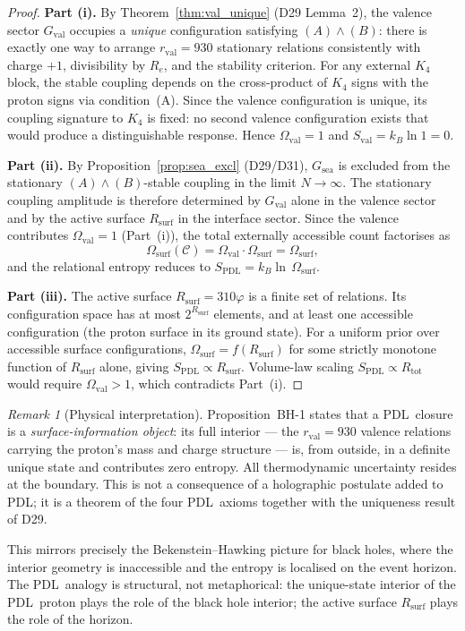 \documentclass[11pt,a4paper]{article}
\theoremstyle{plain}
\theoremstyle{definition}
\theoremstyle{remark}
\newtheorem{remark}[theorem]{Remark}
\newcommand{\PDL}{\textsc{PDL}}
\newcommand{\Kfour}{K_4}
\newcommand{\rval}{r_{\mathrm{val}}}
\newcommand{\Rtot}{R_{\mathrm{tot}}}
\newcommand{\Rsurf}{R_{\mathrm{surf}}}
\newcommand{\Gval}{G_{\mathrm{val}}}
\newcommand{\Gsea}{G_{\mathrm{sea}}}
\newcommand{\vp}{\varphi}
\newcommand{\SPDL}{S_{\mathrm{PDL}}}
\newcommand{\Omsurf}{\Omega_{\mathrm{surf}}}
\begin{document}
\begin{proof}
\textbf{Part (i).}
By Theorem~\ref{thm:val_unique} (D29 Lemma~2), the valence sector $\Gval$ occupies a
\emph{unique} configuration satisfying $(A)\wedge(B)$: there is exactly one way to
arrange $\rval = 930$ stationary relations consistently with charge $+1$,
divisibility by $R_e$, and the stability criterion. For any external $\Kfour$ block,
the stable coupling depends on the cross-product of $\Kfour$ signs with the proton
signs via condition~(A). Since the valence configuration is unique, its coupling
signature to $\Kfour$ is fixed: no second valence configuration exists that would
produce a distinguishable response. Hence $\Omega_{\mathrm{val}} = 1$ and
$S_{\mathrm{val}} = k_B\ln 1 = 0$.

\textbf{Part (ii).}
By Proposition~\ref{prop:sea_excl} (D29/D31), $\Gsea$ is excluded from the
stationary $(A)\wedge(B)$-stable coupling in the limit $N\to\infty$. The stationary
coupling amplitude is therefore determined by $\Gval$ alone in the valence sector
and by the active surface $\Rsurf$ in the interface sector. Since the valence
contributes $\Omega_{\mathrm{val}} = 1$ (Part~(i)), the total externally accessible
count factorises as
\begin{equation}
  \Omsurf(\mathcal{C}) = \Omega_{\mathrm{val}}\cdot\Omega_{\mathrm{surf}} = \Omega_{\mathrm{surf}},
\end{equation}
and the relational entropy reduces to $\SPDL = k_B\ln\,\Omega_{\mathrm{surf}}$.

\textbf{Part (iii).}
The active surface $\Rsurf = 310\vp$ is a finite set of relations. Its configuration
space has at most $2^{\Rsurf}$ elements, and at least one accessible configuration
(the proton surface in its ground state). For a uniform prior over accessible
surface configurations, $\Omega_{\mathrm{surf}} = f(\Rsurf)$ for some strictly
monotone function of $\Rsurf$ alone, giving $\SPDL \propto \Rsurf$. Volume-law
scaling $\SPDL \propto \Rtot$ would require $\Omega_{\mathrm{val}} > 1$, which
contradicts Part~(i).
\end{proof}

\begin{remark}[Physical interpretation]
\label{rem:interpretation}
Proposition~BH-1 states that a \PDL\ closure is a \emph{surface-information object}:
its full interior --- the $\rval = 930$ valence relations carrying the proton's mass
and charge structure --- is, from outside, in a definite unique state and contributes
zero entropy. All thermodynamic uncertainty resides at the boundary. This is not a
consequence of a holographic postulate added to \PDL; it is a theorem of the four
\PDL\ axioms together with the uniqueness result of D29.

This mirrors precisely the Bekenstein--Hawking picture for black holes, where the
interior geometry is inaccessible and the entropy is localised on the event horizon.
The \PDL\ analogy is structural, not metaphorical: the unique-state interior of the
\PDL\ proton plays the role of the black hole interior; the active surface $\Rsurf$
plays the role of the horizon.
\end{remark}
\end{document}
